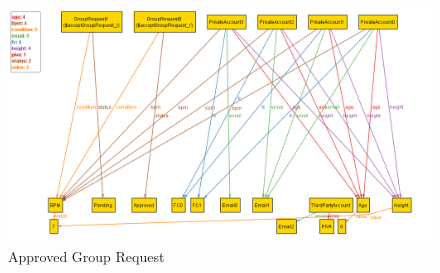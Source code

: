 \documentclass[titlepage]{article}
\begin{document}
		\begin{figure}[H]
			\center
  			\includegraphics[width=0.7\columnwidth]{Alloy/groupRequest.png}
			\caption{Approved Group Request}
			\label{fig:groupg}
		\end{figure}
\end{document}
